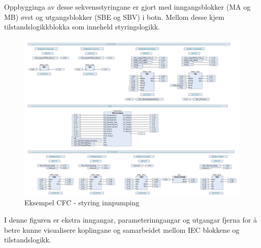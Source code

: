 Oppbygginga av desse sekvensstyringane er gjort med inngangsblokker (\gls{MA} og \gls{MB}) øvst og utgangsblokker (\gls{SBE} og \gls{SBV}) i botn.
Mellom desse kjem tilstandslogikkblokka som inneheld styringslogikk.

\begin{figure}[htbp]
    \centering
    \includegraphics[width=1\textwidth]{Bilder/Heile_innpump.png}
    \caption{Eksempel \gls{CFC} - styring innpumping}\label{fig:CFCInnpumping}
\end{figure}

I denne figuren er ekstra inngangar, parameterinngangar og utgangar fjerna for å betre kunne visualisere koplingane og samarbeidet mellom
\gls{IEC} blokkene og tilstandslogikk.

\newpage

